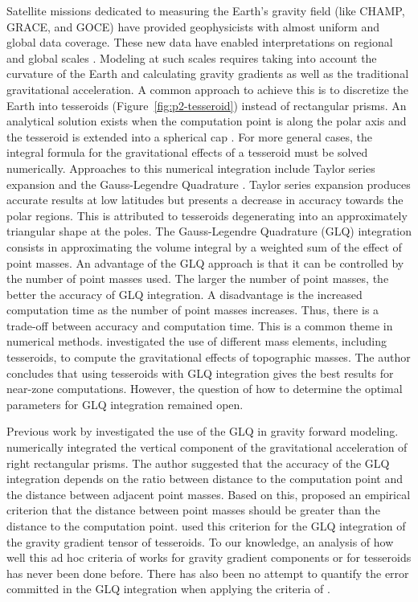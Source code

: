 Satellite missions dedicated to measuring the Earth's gravity field
(like CHAMP, GRACE, and GOCE)
have provided geophysicists with almost uniform and global data coverage.
These new data have enabled interpretations on regional and global scales
\citep[e.g.][]{reguzzoni2013,braitenberg2015}.
Modeling at such scales requires taking into account the curvature of the
Earth and calculating gravity gradients as well as the traditional
gravitational acceleration.
A common approach to achieve this is
to discretize the Earth into tesseroids (Figure~\ref{fig:p2-tesseroid})
instead of rectangular prisms.
An analytical solution exists when the computation point is along
the polar axis and the tesseroid is extended into a spherical cap
\citep{lafehr1991a, mikuska2006, grombein2013}.
For more general cases,
the integral formula for the gravitational effects of a tesseroid
must be solved numerically.
Approaches to this numerical integration include
Taylor series expansion \citep{heck2007, grombein2013}
and the Gauss-Legendre Quadrature \citep{asgharzadeh2007}.
Taylor series expansion produces accurate results at low latitudes but
presents a decrease in accuracy towards the polar regions.
This is attributed to tesseroids degenerating into an approximately triangular
shape at the poles.
The Gauss-Legendre Quadrature (GLQ) integration consists in approximating
the volume integral by a weighted sum of the effect of point masses.
An advantage of the GLQ approach is that it can be
controlled by the number of point masses used.
The larger the number of point masses,
the better the accuracy of GLQ integration.
A disadvantage is the increased computation time as the number of
point masses increases.
Thus, there is a trade-off between accuracy and computation time.
This is a common theme in numerical methods.
\citet{wild-pfeiffer2008} investigated the use of different mass elements,
including tesseroids, to compute the gravitational effects of topographic
masses.
The author concludes that using tesseroids with GLQ integration gives the best
results for near-zone computations.
However, the question of how to determine the optimal parameters for GLQ
integration remained open.


Previous work by \citet{ku1977} investigated the use of the GLQ
in gravity forward modeling.
\citet{ku1977} numerically integrated the vertical component of the
gravitational acceleration of right rectangular prisms.
The author suggested that the accuracy of the GLQ integration depends on
the ratio between distance to the computation point and the distance between
adjacent point masses.
Based on this, \citet{ku1977} proposed an empirical criterion that
the distance between point masses should be greater than
the distance to the computation point.
\citet{asgharzadeh2007} used  this criterion for the GLQ integration of
the gravity gradient tensor of tesseroids.
To our knowledge, an analysis of how well this ad hoc criteria of
\citet{ku1977} works for gravity gradient components or for tesseroids
has never been done before.
There has also been no attempt to quantify the error committed in the GLQ
integration when applying the criteria of \citet{ku1977}.

